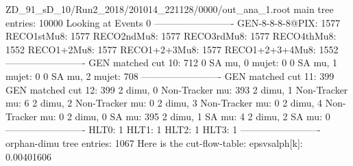 ZD_91_sD_10/Run2_2018/201014_221128/0000/out_ana_1.root
main tree entries: 10000
Looking at Events 0
-------------------------
GEN-8-8-8-8@PIX: 1577
RECO1stMu8: 1577
RECO2ndMu8: 1577
RECO3rdMu8: 1577
RECO4thMu8: 1552
RECO1+2Mu8: 1577
RECO1+2+3Mu8: 1577
RECO1+2+3+4Mu8: 1552
-------------------------
GEN matched cut 10: 712
0 SA mu, 0 mujet: 0
0 SA mu, 1 mujet: 0
0 SA mu, 2 mujet: 708
-------------------------
GEN matched cut 11: 399
GEN matched cut 12: 399
2 dimu, 0 Non-Tracker mu: 393
2 dimu, 1 Non-Tracker mu: 6
2 dimu, 2 Non-Tracker mu: 0
2 dimu, 3 Non-Tracker mu: 0
2 dimu, 4 Non-Tracker mu: 0
2 dimu, 0 SA mu: 395
2 dimu, 1 SA mu: 4
2 dimu, 2 SA mu: 0
-------------------------
HLT0: 1
HLT1: 1
HLT2: 1
HLT3: 1
-------------------------
orphan-dimu tree entries: 1067
Here is the cut-flow-table:
epsvsalph[k]: 0.00401606
        
